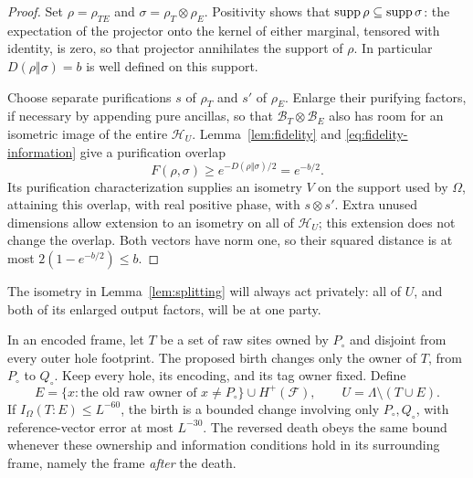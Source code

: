 \begin{proof}
Set $\rho=\rho_{TE}$ and $\sigma=\rho_T\otimes\rho_E$.  Positivity shows
that $\operatorname{supp}\rho\subseteq\operatorname{supp}\sigma$: the expectation of the projector
onto the kernel of either marginal, tensored with identity, is zero, so
that projector annihilates the support of $\rho$.  In particular
$D(\rho\Vert\sigma)=b$ is well defined on this support.

Choose separate purifications $s$ of $\rho_T$ and $s'$ of $\rho_E$.  Enlarge
their purifying factors, if necessary by appending pure ancillas, so that
$\mathcal B_T\otimes\mathcal B_E$ also has room for an isometric image of
the entire $\mathcal H_U$.  Lemma~\ref{lem:fidelity} and
\eqref{eq:fidelity-information} give a purification overlap
\[
 F(\rho,\sigma)\ge e^{-D(\rho\Vert\sigma)/2}=e^{-b/2}.
\]
Its purification characterization supplies an isometry $V$ on the support
used by $\Omega$, attaining this overlap, with real positive phase, with
$s\otimes s'$.  Extra unused dimensions allow extension to an isometry on
all of $\mathcal H_U$; this extension does not change the overlap.  Both
vectors have norm one, so their squared distance is at most
$2(1-e^{-b/2})\le b$.
\end{proof}

The isometry in Lemma~\ref{lem:splitting} will always act privately: all of
$U$, and both of its enlarged output factors, will be at one party.

\begin{lemma}\label{lem:birth}
In an encoded frame, let $T$ be a set of raw sites owned by $P_\circ$ and
disjoint from every outer hole footprint.  The proposed birth changes only
the owner of $T$, from $P_\circ$ to $Q_\circ$.  Keep every hole, its encoding,
and its tag owner fixed.  Define
\begin{equation}\label{eq:birth-partition}
 E=\{x:\text{the old raw owner of }x\ne P_\circ\}
        \cup H^+(\mathcal F),\qquad
 U=\Lambda\setminus(T\cup E).
\end{equation}
If $I_\Omega(T:E)\le L^{-60}$, the birth is a bounded change involving
only $P_\circ,Q_\circ$, with reference-vector error at most $L^{-30}$.
The reversed death obeys the same bound whenever these ownership and
information conditions hold in its surrounding frame, namely the frame
\emph{after} the death.
\end{lemma}


